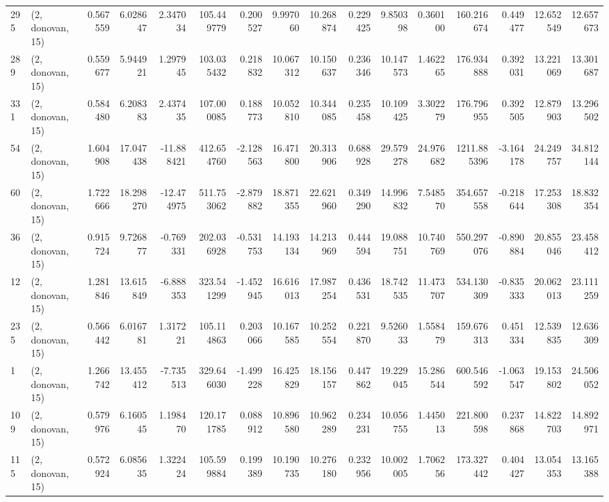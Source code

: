 \begin{tabular}{llrrrrrrrrrrrrrr}
295 &  (2, donovan, 15) &   0.567559 &   6.028647 &   2.347034 &   105.449779 &   0.200527 &   9.997060 &  10.268874 &  0.229425 &   9.850398 &   0.360100 &   160.216674 &  0.449477 &  12.652549 &  12.657673 \\
289 &  (2, donovan, 15) &   0.559677 &   5.944921 &   1.297945 &   103.035432 &   0.218832 &  10.067312 &  10.150637 &  0.236346 &  10.147573 &   1.462265 &   176.934888 &  0.392031 &  13.221069 &  13.301687 \\
331 &  (2, donovan, 15) &   0.584480 &   6.208383 &   2.437435 &   107.000085 &   0.188773 &  10.052810 &  10.344085 &  0.235458 &  10.109425 &   3.302279 &   176.796955 &  0.392505 &  12.879903 &  13.296502 \\
54  &  (2, donovan, 15) &   1.604908 &  17.047438 & -11.888421 &   412.654760 &  -2.128563 &  16.471800 &  20.313906 &  0.688928 &  29.579278 &  24.976682 &  1211.885396 & -3.164178 &  24.249757 &  34.812144 \\
60  &  (2, donovan, 15) &   1.722666 &  18.298270 & -12.474975 &   511.753062 &  -2.879882 &  18.871355 &  22.621960 &  0.349290 &  14.996832 &   7.548570 &   354.657558 & -0.218644 &  17.253308 &  18.832354 \\
36  &  (2, donovan, 15) &   0.915724 &   9.726877 &  -0.769331 &   202.036928 &  -0.531753 &  14.193134 &  14.213969 &  0.444594 &  19.088751 &  10.740769 &   550.297076 & -0.890884 &  20.855046 &  23.458412 \\
12  &  (2, donovan, 15) &   1.281846 &  13.615849 &  -6.888353 &   323.541299 &  -1.452945 &  16.616013 &  17.987254 &  0.436531 &  18.742535 &  11.473707 &   534.130309 & -0.835333 &  20.062013 &  23.111259 \\
235 &  (2, donovan, 15) &   0.566442 &   6.016781 &   1.317221 &   105.114863 &   0.203066 &  10.167585 &  10.252554 &  0.221870 &   9.526033 &   1.558479 &   159.676313 &  0.451334 &  12.539835 &  12.636309 \\
1   &  (2, donovan, 15) &   1.266742 &  13.455412 &  -7.735513 &   329.646030 &  -1.499228 &  16.425829 &  18.156157 &  0.447862 &  19.229045 &  15.286544 &   600.546592 & -1.063547 &  19.153802 &  24.506052 \\
109 &  (2, donovan, 15) &   0.579976 &   6.160545 &   1.198470 &   120.171785 &   0.088912 &  10.896580 &  10.962289 &  0.234231 &  10.056755 &   1.445013 &   221.800598 &  0.237868 &  14.822703 &  14.892971 \\
115 &  (2, donovan, 15) &   0.572924 &   6.085635 &   1.322424 &   105.599884 &   0.199389 &  10.190735 &  10.276180 &  0.232956 &  10.002005 &   1.706256 &   173.327442 &  0.404427 &  13.054353 &  13.165388 \\

\end{tabular}
